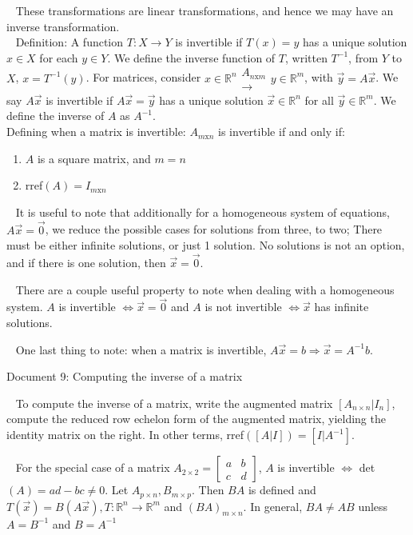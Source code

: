 \documentclass[12pt]{article}
\begin{document}
$\,\,\,$ These transformations are linear transformations, and hence we may have an inverse transformation.\\
\newpage
$\,\,\,$ Definition: A function $T:X\rightarrow Y$ is invertible if $T(x)=y$ has a unique solution $x\in X$ for each $y\in Y$. We define the inverse function of $T$, written $T^{-1}$, from $Y$ to $X$, $x=T^{-1}(y)$. For matrices, consider $x\in\mathbb{R}^n\begin{matrix}A_{n\text{x}m}\\ \rightarrow \end{matrix}y\in\mathbb{R}^m$, with $\vec{y}=A\vec{x}$.
We say $A\vec{x}$ is invertible if $A\vec{x}=\vec{y}$ has a unique solution $\vec{x}\in\mathbb{R}^n$ for all $\vec{y}\in\mathbb{R}^m$. We define the inverse of $A$ as $A^{-1}$.\\

Defining when a matrix is invertible:
$A_{m\text{x}n}$ is invertible if and only if:
\begin{enumerate}
\item $A$ is a square matrix, and $m=n$
\item rref$(A)=I_{m\text{x}n}$
\end{enumerate}

$\,\,\,$ It is useful to note that additionally for a homogeneous system of equations, $A\vec{x}=\vec{0}$, we reduce the possible cases for solutions from three, to two; There must be either infinite solutions, or just 1 solution. No solutions is not an option, and if there is one solution, then $\vec{x}=\vec{0}$.

$\,\,\,$ There are a couple useful property to note when dealing with a homogeneous system. $A$ is invertible $\Leftrightarrow \vec{x}=\vec{0}$ and $A$ is not invertible $\Leftrightarrow \vec{x}$ has infinite solutions.

$\,\,\,$ One last thing to note: when a matrix is invertible, $A\vec{x}=b\Rightarrow\vec{x}=A^{-1}b$.

\newpage
\begin{center}
Document 9: Computing the inverse of a matrix
\end{center}

\setlength{\leftskip}{0in}
$\,\,\,$ To compute the inverse of a matrix, write the augmented matrix $[A_{n\times n}|I_n]$, compute the reduced row echelon form of the augmented matrix, yielding the identity matrix on the right. In other terms, rref$([A|I])=[I|A^{-1}]$.

$\,\,\,$ For the special case of a matrix $A_{2\times 2}=\begin{bmatrix}a & b\\c & d\end{bmatrix}$, $A$ is invertible $\Leftrightarrow$ det$(A)=ad-bc\not =0$. Let $A_{p\times n},B_{m\times p}$. Then $BA$ is defined and $T(\vec{x})=B(A\vec{x}),T:\mathbb{R}^n\rightarrow\mathbb{R}^m$ and $(BA)_{m\times n}$. In general, $BA\not =AB$ unless $A=B^{-1}$ and $B=A^{-1}$\\
\end{document}
